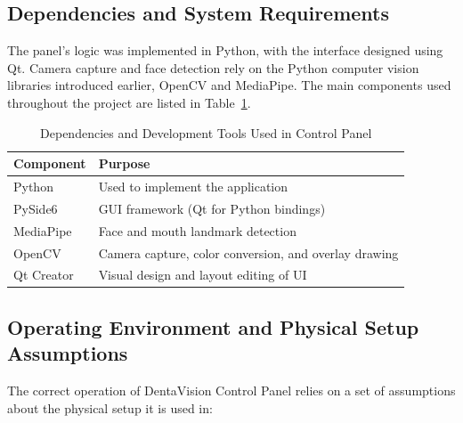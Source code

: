 \subsection{Dependencies and System Requirements}

The panel's logic was implemented in Python, with the interface designed using Qt. 
Camera capture and face detection rely on the Python computer vision libraries introduced earlier, OpenCV and MediaPipe. 
The main components used throughout the project are listed in Table~\ref{tab:dependencies}.


\begin{table}[h]
    \centering
    \caption{Dependencies and Development Tools Used in Control Panel}
    \label{tab:dependencies}
    \begin{tabularx}{\columnwidth}{@{}l X@{}}
        \toprule
        \textbf{Component} & \textbf{Purpose} \\
        \midrule
        Python   & Used to implement the application \\
        PySide6 & GUI framework (Qt for Python bindings) \\
        MediaPipe & Face and mouth landmark detection \\
        OpenCV & Camera capture, color conversion, and overlay drawing \\
        Qt Creator & Visual design and layout editing of UI \\
        \bottomrule
    \end{tabularx}
\end{table}

\subsection{Operating Environment and Physical Setup Assumptions}
The correct operation of DentaVision Control Panel relies on a set of assumptions about the physical setup it is used in:

